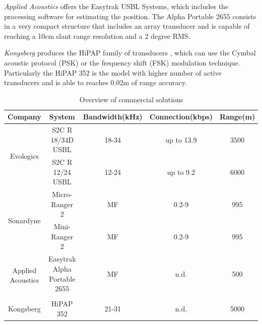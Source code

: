 \textit{Applied Acoustics} offers the Easytrak USBL Systems, which includes the processing software for estimating the position. The Alpha Portable 2655 consists in a very compact structure that includes an array transducer and is capable of reaching a 10cm slant range resolution and a 2 degree RMS.

\textit{Kongsberg} produces the HiPAP family of transducers \cite{hipap_hardw}, which can use the Cymbal acoustic protocol (PSK) or the frequency shift (FSK) modulation technique. Particularly the HiPAP 352 is the model with higher number of active transducers and is able to reaches 0.02m of range accuracy.

\begin{table}[t]
	\centering
	\begin{tabular}{|c|c|c c c|}
		\hline
		Company
		& System
		& Bandwidth(kHz)
		& Connection(kbps)
		& Range(m) \\ \hline 
		\multirow{2}{4em}{Evologics} 
		& S2C R 18/34D USBL & 18-34 & up to 13.9 & 3500\\
		& S2C R 12/24 USBL & 12-24 & up to 9.2 & 6000\\
		\hline 
		\multirow{2}{4em}{Sonardyne} 
		& Micro-Ranger 2 & MF & 0.2-9 & 995\\
		& Mini-Ranger 2 & MF & 0.2-9 & 995\\ 
		\hline 
		\multirow{2}{4em}{Applied Acoustics} 
		& Easytrak Alpha Portable 2655 & MF & n.d. & 500 \\
		&  &  &  & \\
		\hline 
		\multirow{1}{4em}{Kongsberg} 
		& HiPAP 352 & 21-31 & n.d. & 5000 \\
		\hline 
	\end{tabular}
	\caption{Overview of commercial solutions}
	\label{tab:solutions}
\end{table}







